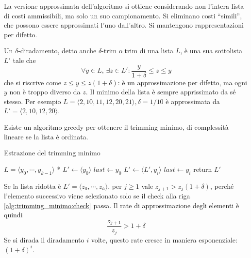 La versione approssimata dell'algoritmo si ottiene considerando non l'intera lista di costi ammissibili, ma solo un suo campionamento. Si eliminano costi ``simili'', che possono essere approssimati l'uno dall'altro. Si mantengono rappresentazioni per difetto.
\begin{definition}
    \label{def:deltadiradamento}
    Un $\delta$-diradamento, detto anche $\delta$-trim o trim di una lista $L$, è una sua sottolista $L'$ tale che
    \begin{equation*}
        \forall y \in L, \,
        \exists z \in L' :
        \frac{y}{1+\delta} \leq z \leq y
    \end{equation*}
    che si riscrive come $
        z \leq y \leq z \left( 1+\delta \right)
    $: è un approssimazione per difetto, ma ogni $y$ non è troppo diverso da $z$.
    Il minimo della lista è sempre apprissimato da sé stesso.
    Per esempio $
        L = \langle
            2, 10, 11, 12, 20, 21
            \rangle, \delta = 1/10 $ è approssimata da $
        L' = \langle
            2, 10, 12, 20
            \rangle
    $.
\end{definition}
Esiste un algoritmo greedy per ottenere il trimming minimo, di complessità lineare se la lista è ordinata.
\begin{algorithm}[H]
\caption{Estrazione del trimming minimo}\label{alg:trimming_minimo}
\begin{algorithmic}[1]
        \State * $L = \langle y_0, \cdots, y_{k-1} \rangle $ *
        \State $L' \gets \langle y_0 \rangle $
        \State $last \gets y_0$
            \label{alg:trimming_minimo:check}
                \State $L' \gets \langle L', y_i \rangle $
                \State $last \gets y_i$
            \EndIf
        \EndFor
        \State return $L'$
    \EndProcedure
\end{algorithmic}
\end{algorithm}
Se la lista ridotta è $
L' = \langle z_0, \cdots, z_{h} \rangle
$, per $j \geq 1$ vale $
z_{j+1} > z_j \left( 1+\delta \right)
$, perché l'elemento successivo viene selezionato solo se il check alla riga \ref{alg:trimming_minimo:check} passa.
Il rate di approssimazione degli elementi è quindi
\begin{equation*}
    \frac{
        z_{j+1}
    }{
        z_j
    } >  1+\delta 
\end{equation*}
Se si dirada il diradamento $i$ volte, questo rate cresce in maniera esponenziale: $
\left( 1+\delta \right)^i
$.

